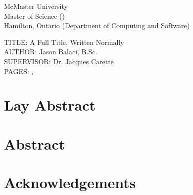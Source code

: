 \documentclass[12pt,oneside]{book}
\begin{document}
\pagestyle{fancy}
\fancyhead{}
\fancyfoot{}
\fancyfoot[C]{\thepage}
\renewcommand{\headrulewidth}{0pt} %

\setcounter{page}{2} %

\noindent
McMaster University \\
Master of Science (\the\year{}) \\
Hamilton, Ontario (Department of Computing and Software)

\vspace{2cm}

\noindent
TITLE: A Full Title, Written Normally \\
AUTHOR: Jason Balaci, B.Sc. \\
SUPERVISOR: Dr. Jacques Carette \\
PAGES: \pageref{lastOfFrontMatter}, \pageref{LastPage}

\newpage


\chapter*{Lay Abstract}



\chapter{Abstract}



\chapter{Acknowledgements}


\end{document}
